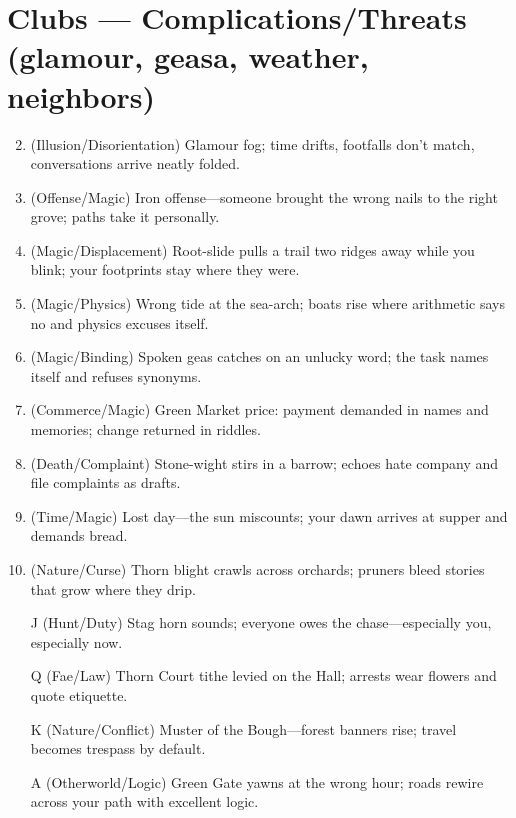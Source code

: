 \section*{Clubs --- Complications/Threats (glamour, geasa, weather, neighbors)}
\label{sec:aelinnel-complications}
\begin{enumerate}
\setcounter{enumi}{1}
\item (Illusion/Disorientation) Glamour fog; time drifts, footfalls don't match, conversations arrive neatly folded.
\item (Offense/Magic) Iron offense---someone brought the wrong nails to the right grove; paths take it personally.
\item (Magic/Displacement) Root-slide pulls a trail two ridges away while you blink; your footprints stay where they were.
\item (Magic/Physics) Wrong tide at the sea-arch; boats rise where arithmetic says no and physics excuses itself.
\item (Magic/Binding) Spoken geas catches on an unlucky word; the task names itself and refuses synonyms.
\item (Commerce/Magic) Green Market price: payment demanded in names and memories; change returned in riddles.
\item (Death/Complaint) Stone-wight stirs in a barrow; echoes hate company and file complaints as drafts.
\item (Time/Magic) Lost day---the sun miscounts; your dawn arrives at supper and demands bread.
\item (Nature/Curse) Thorn blight crawls across orchards; pruners bleed stories that grow where they drip.
\item[J] (Hunt/Duty) Stag horn sounds; everyone owes the chase---especially you, especially now.
\item[Q] (Fae/Law) Thorn Court tithe levied on the Hall; arrests wear flowers and quote etiquette.
\item[K] (Nature/Conflict) Muster of the Bough---forest banners rise; travel becomes trespass by default.
\item[A] (Otherworld/Logic) Green Gate yawns at the wrong hour; roads rewire across your path with excellent logic.
\end{enumerate}

